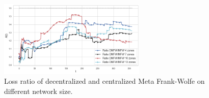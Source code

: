 \begin{figure}
    \centering
    \includegraphics[width=7cm]{./img/baseline-compare/ratio_multiple_setting.png}
    \caption{Loss ratio of decentralized and centralized Meta Frank-Wolfe on different network size.}
    \label{fig:ratio}
\end{figure}












